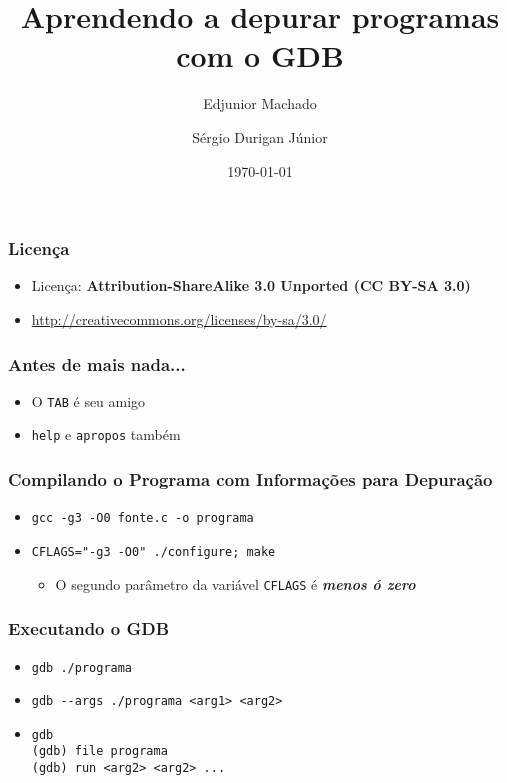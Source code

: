 \documentclass[xcolor=pdftex,dvipsnames,table,t]{beamer}
\title{Aprendendo a depurar programas com o GDB}
\author{Edjunior Machado \and
	Sérgio Durigan Júnior}
\date[Unicamp]{\today}
\begin{document}

\begin{frame}
	\frametitle{Licença}
	\begin{itemize}
		\item{Licença: \textbf{Attribution-ShareAlike 3.0 Unported (CC BY-SA 3.0)}}
		\item{\url{http://creativecommons.org/licenses/by-sa/3.0/}}
	\end{itemize}
\end{frame}

\begin{frame}[fragile]
	\frametitle{Antes de mais nada...}
	\begin{itemize}
	  \item{O \verb|TAB| é seu amigo}
	  \item{\verb|help| e \verb|apropos| também}
	\end{itemize}
\end{frame}

\begin{frame}[fragile]
	\frametitle{Compilando o Programa com Informações para Depuração}
	  \begin{itemize}
	    \item{\verb|gcc -g3 -O0 fonte.c -o programa|}
	    \item{\verb|CFLAGS="-g3 -O0" ./configure; make|}
	      \begin{itemize}
		\item{O segundo parâmetro da variável \verb|CFLAGS| é \textbf{\textit{menos ó zero}}}
	      \end{itemize}
	  \end{itemize}
\end{frame}

\begin{frame}[fragile]
	\frametitle{Executando o GDB}
	  \begin{itemize}
	    \item{\verb|gdb ./programa|}
	    \item{\verb|gdb --args ./programa <arg1> <arg2>|}
	    \item{\verb|gdb| \\
		\verb|(gdb) file programa| \\
		\verb|(gdb) run <arg2> <arg2> ...|}
	  \end{itemize}
\end{frame}
\end{document}
